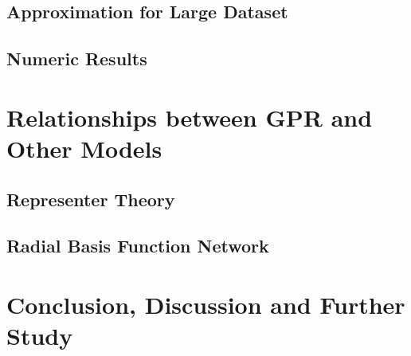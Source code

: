 \documentclass[12pt,a4paper]{article}
\theoremstyle{definition}
\numberwithin{equation}{section}
\begin{document}
\subsection{Approximation for Large Dataset}

\subsection{Numeric Results}

\newpage
\section{Relationships between GPR and Other Models}

\subsection{Representer Theory}

\subsection{Radial Basis Function Network}

\newpage
\section{Conclusion, Discussion and Further Study}
\end{document}
